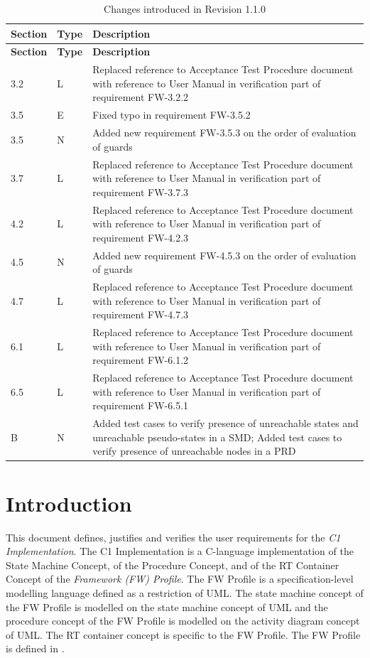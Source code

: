 \documentclass[a4paper,10pt]{article}
\let\stdsection\section
\renewcommand\section{\newpage\stdsection}
\begin{document}
\begin{longtable}{|p{1.5cm}|p{1cm}|p{8cm}|}
\caption{Changes introduced in Revision 1.1.0} \\
\hline
\rowcolor{light-gray}
\textbf{Section} & \textbf{Type} & \textbf{Description} \\
\hline\hline
\endfirsthead
\rowcolor{light-gray}
\textbf{Section} & \textbf{Type} & \textbf{Description} \\
\hline\hline
\endhead
3.2 & L & Replaced reference to Acceptance Test Procedure document with reference to User Manual in verification part of requirement FW-3.2.2 \\
\hline
3.5 & E & Fixed typo in requirement FW-3.5.2 \\
\hline
3.5 & N & Added new requirement FW-3.5.3 on the order of evaluation of guards \\
\hline
3.7 & L & Replaced reference to Acceptance Test Procedure document with reference to User Manual in verification part of requirement FW-3.7.3 \\
\hline
4.2 & L & Replaced reference to Acceptance Test Procedure document with reference to User Manual in verification part of requirement FW-4.2.3 \\
\hline
4.5 & N & Added new requirement FW-4.5.3 on the order of evaluation of guards \\
\hline
4.7 & L & Replaced reference to Acceptance Test Procedure document with reference to User Manual in verification part of requirement FW-4.7.3 \\
\hline
6.1 & L & Replaced reference to Acceptance Test Procedure document with reference to User Manual in verification part of requirement FW-6.1.2 \\
\hline
6.5 & L & Replaced reference to Acceptance Test Procedure document with reference to User Manual in verification part of requirement FW-6.5.1 \\
\hline
B & N & Added test cases to verify presence of unreachable states and unreachable pseudo-states in a SMD; Added test cases to verify presence of unreachable nodes in a PRD \\
\hline
\end{longtable}

\newpage


\section{Introduction}
This document defines, justifies and verifies the user requirements for the \emph{C1 Implementation}. The C1 Implementation is a C-language implementation of the State Machine Concept, of the Procedure Concept, and of the RT Container Concept of the \emph{Framework (FW) Profile}. The FW Profile is a specification-level modelling language defined as a restriction of UML. The state machine concept of the FW Profile is modelled on the state machine concept of UML and the procedure concept of the FW Profile is modelled on the activity diagram concept of UML. The RT container concept is specific to the FW Profile. The FW Profile is defined in \cite{ref:fwprofile}. 
\end{document}

